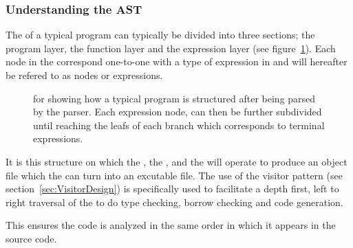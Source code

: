 \subsubsection{Understanding the AST}
\label{sec:AST}

The \ast{} of a typical \lang{} program can typically be divided into three
sections; the program layer, the function layer and the expression layer (see
figure~\ref{fig:astStruct}). Each node in the \ast{} correspond one-to-one with a
type of expression in \lang{} and will hereafter be refered to as nodes or
expressions. 

\newpage 

\begin{figure}[ht]
  \centering
  \caption{\ast{} for \lang{} showing how a typical program is structured after
  being parsed by the \lang{} parser. Each expression node, can then be further
subdivided until reaching the leafs of each branch which corresponds to terminal
expressions.}
  \label{fig:astStruct}
\end{figure}

It is this structure on which the \typeChecker, the \borrowChecker, and the
\codeGen{} will operate to produce an object file which the \gcc{} can turn into an
excutable file. The use of the visitor pattern (see section~\ref{sec:VisitorDesign})
is specifically used to facilitate a depth first, left to right traversal of the
\ast{} to do type checking, borrow checking and code generation.

This ensures the code is analyzed in the same order in which it appears in the
source code.

